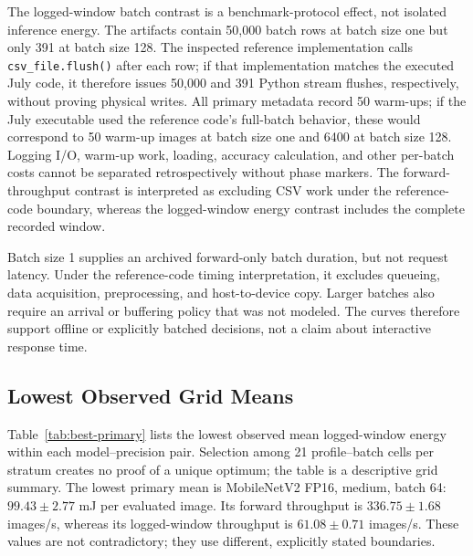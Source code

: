 \documentclass[electronics,article,submit,pdftex,moreauthors]{Definitions/mdpi}
\newcommand{\mobile}{MobileNetV2}
\renewcommand{\tabref}[1]{Table~\ref{#1}}
\begin{document}
The logged-window batch contrast is a benchmark-protocol effect, not isolated inference energy. The artifacts contain 50,000 batch rows at batch size one but only 391 at batch size 128. The inspected reference implementation calls \texttt{csv\_file.flush()} after each row; if that implementation matches the executed July code, it therefore issues 50,000 and 391 Python stream flushes, respectively, without proving physical writes. All primary metadata record 50 warm-ups; if the July executable used the reference code's full-batch behavior, these would correspond to 50 warm-up images at batch size one and 6400 at batch size 128. Logging I/O, warm-up work, loading, accuracy calculation, and other per-batch costs cannot be separated retrospectively without phase markers. The forward-throughput contrast is interpreted as excluding CSV work under the reference-code boundary, whereas the logged-window energy contrast includes the complete recorded window.

Batch size 1 supplies an archived forward-only batch duration, but not request latency. Under the reference-code timing interpretation, it excludes queueing, data acquisition, preprocessing, and host-to-device copy. Larger batches also require an arrival or buffering policy that was not modeled. The curves therefore support offline or explicitly batched decisions, not a claim about interactive response time.

\subsection{Lowest Observed Grid Means}

\tabref{tab:best-primary} lists the lowest observed mean logged-window energy within each model--precision pair. Selection among 21 profile--batch cells per stratum creates no proof of a unique optimum; the table is a descriptive grid summary. The lowest primary mean is \mobile{} FP16, medium, batch 64: $99.43\pm2.77$ mJ per evaluated image. Its forward throughput is $336.75\pm1.68$ images/s, whereas its logged-window throughput is $61.08\pm0.71$ images/s. These values are not contradictory; they use different, explicitly stated boundaries.
\end{document}
